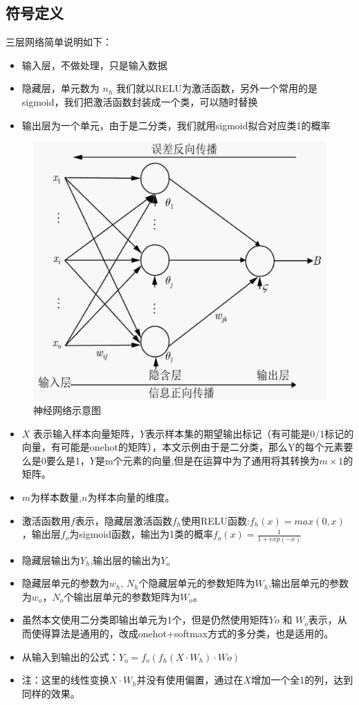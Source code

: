 \documentclass[12pt, a4paper, oneside]{ctexart}
\begin{document}
\subsection{符号定义}
三层网络简单说明如下：
\begin{itemize}
    \item 输入层，不做处理，只是输入数据
    \item 隐藏层，单元数为 $ n_h $ 我们就以RELU为激活函数，另外一个常用的是sigmoid，我们把激活函数封装成一个类，可以随时替换 
    \item 输出层为一个单元，由于是二分类，我们就用sigmoid拟合对应类1的概率
\end{itemize}
\begin{figure}[htbp]
    \centering
    \includegraphics[width=14cm]{bpnn.png}
    \caption{神经网络示意图}\label{fig1}
\end{figure}


\begin{itemize}
\item $X$ 表示输入样本向量矩阵，$Y$表示样本集的期望输出标记（有可能是0/1标记的向量，有可能是onehot的矩阵），本文示例由于是二分类，那么Y的每个元素要么是0要么是1，$Y$是m个元素的向量,但是在运算中为了通用将其转换为$m\times 1$的矩阵。
\item $m$为样本数量,$n$为样本向量的维度。
\item 激活函数用$f$表示，隐藏层激活函数$f_h$使用RELU函数:$f_h(x) = max(0, x)$，输出层$f_o$为sigmoid函数，输出为1类的概率$f_o(x) = \frac{1}{1+exp(-x)}$
\item 隐藏层输出为$Y_h$,输出层的输出为$Y_o$
\item 隐藏层单元的参数为$w_h$, $N_h$个隐藏层单元的参数矩阵为$W_h$,输出层单元的参数为$w_o$，$N_o$个输出层单元的参数矩阵为$W_o$。
\item 虽然本文使用二分类即输出单元为1个，但是仍然使用矩阵$Yo $ 和 $ W_o$表示，从而使得算法是通用的，改成onehot+softmax方式的多分类，也是适用的。
\item 从输入到输出的公式：$Y_o = f_o(f_h(X \cdot W_h) \cdot Wo)$
\item 注：这里的线性变换$X \cdot W_h$并没有使用偏置，通过在$X$增加一个全1的列，达到同样的效果。
\end{itemize}
\end{document}
